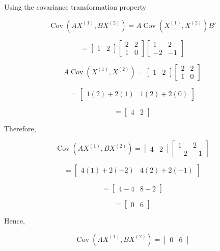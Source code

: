 \documentclass[12pt]{article}
\begin{document}
\noindent
Using the covariance transformation property

\[
\operatorname{Cov}(AX^{(1)},BX^{(2)})
=
A\operatorname{Cov}(X^{(1)},X^{(2)})B'
\]

\[
=
\begin{bmatrix}
1 & 2
\end{bmatrix}
\begin{bmatrix}
2 & 2\\
1 & 0
\end{bmatrix}
\begin{bmatrix}
1 & 2\\
-2 & -1
\end{bmatrix}
\]

\[
A\operatorname{Cov}(X^{(1)},X^{(2)})
=
\begin{bmatrix}
1 & 2
\end{bmatrix}
\begin{bmatrix}
2 & 2\\
1 & 0
\end{bmatrix}
\]

\[
=
\begin{bmatrix}
1(2)+2(1) &
1(2)+2(0)
\end{bmatrix}
\]

\[
=
\begin{bmatrix}
4 & 2
\end{bmatrix}
\]

\noindent
Therefore,

\[
\operatorname{Cov}(AX^{(1)},BX^{(2)})
=
\begin{bmatrix}
4 & 2
\end{bmatrix}
\begin{bmatrix}
1 & 2\\
-2 & -1
\end{bmatrix}
\]

\[
=
\begin{bmatrix}
4(1)+2(-2) &
4(2)+2(-1)
\end{bmatrix}
\]

\[
=
\begin{bmatrix}
4-4 & 8-2
\end{bmatrix}
\]

\[
=
\begin{bmatrix}
0 & 6
\end{bmatrix}
\]

\noindent
Hence,

\[
\boxed{
\operatorname{Cov}(AX^{(1)},BX^{(2)})
=
\begin{bmatrix}
0 & 6
\end{bmatrix}
}
\]
\end{document}
